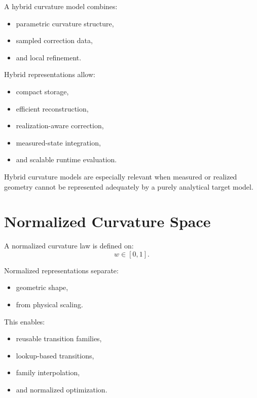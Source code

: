 \begin{definition}
\label{def:hybrid-curvature-model}
A hybrid curvature model combines:
\begin{itemize}
\item parametric curvature structure,
\item sampled correction data,
\item and local refinement.
\end{itemize}
\end{definition}

Hybrid representations allow:
\begin{itemize}
\item compact storage,
\item efficient reconstruction,
\item realization-aware correction,
\item measured-state integration,
\item and scalable runtime evaluation.
\end{itemize}

Hybrid curvature models are especially relevant when measured or
realized geometry cannot be represented adequately by a purely analytical
target model.

\section{Normalized Curvature Space}

\begin{definition}
\label{def:normalized-curvature-law}
A normalized curvature law is defined on:
\[
w\in[0,1].
\]
\end{definition}

Normalized representations separate:
\begin{itemize}
\item geometric shape,
\item from physical scaling.
\end{itemize}

This enables:
\begin{itemize}
\item reusable transition families,
\item lookup-based transitions,
\item family interpolation,
\item and normalized optimization.
\end{itemize}

